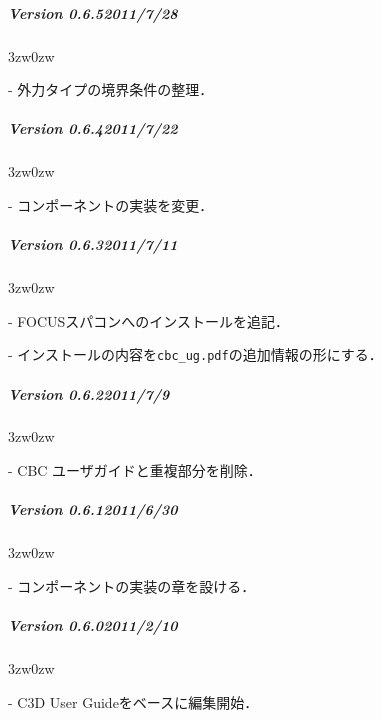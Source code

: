 {%
\subparagraph{Version 0.6.5\hspace{1cm}2011/7/28}

\begin{description}
\begin{indentation}{3zw}{0zw}
\item[-] 外力タイプの境界条件の整理．
\end{indentation}
\end{description}
\vspace{3mm}

%
\subparagraph{Version 0.6.4\hspace{1cm}2011/7/22}

\begin{description}
\begin{indentation}{3zw}{0zw}
\item[-] コンポーネントの実装を変更．
\end{indentation}
\end{description}
\vspace{3mm}

%
\subparagraph{Version 0.6.3\hspace{1cm}2011/7/11}

\begin{description}
\begin{indentation}{3zw}{0zw}
\item[-] FOCUSスパコンへのインストールを追記．
\item[-] インストールの内容を\verb|cbc_ug.pdf|の追加情報の形にする．
\end{indentation}
\end{description}
\vspace{3mm}

%
\subparagraph{Version 0.6.2\hspace{1cm}2011/7/9}

\begin{description}
\begin{indentation}{3zw}{0zw}
\item[-] CBC ユーザガイドと重複部分を削除．
\end{indentation}
\end{description}
\vspace{3mm}

%
\subparagraph{Version 0.6.1\hspace{1cm}2011/6/30}

\begin{description}
\begin{indentation}{3zw}{0zw}
\item[-] コンポーネントの実装の章を設ける．
\end{indentation}
\end{description}
\vspace{3mm}

%
\subparagraph{Version 0.6.0\hspace{1cm}2011/2/10}

\begin{description}
\begin{indentation}{3zw}{0zw}
\item[-] C3D User Guideをベースに編集開始．
\end{indentation}
\end{description}

} %